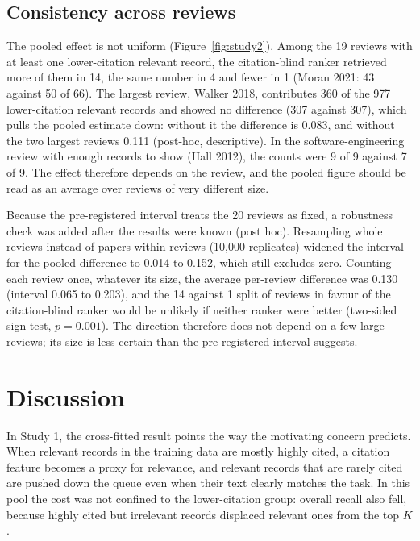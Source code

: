 \documentclass[acmsmall,screen,nonacm]{acmart}
\begin{document}
\subsection{Consistency across reviews}

The pooled effect is not uniform (Figure~\ref{fig:study2}). Among the 19 reviews with at least one
lower-citation relevant record, the citation-blind ranker retrieved more of them in 14, the same number
in 4 and fewer in 1 (Moran 2021: 43 against 50 of 66). The largest review, Walker 2018, contributes 360
of the 977 lower-citation relevant records and showed no difference (307 against 307), which pulls the
pooled estimate down: without it the difference is 0.083, and without the two largest reviews 0.111
(post-hoc, descriptive). In the software-engineering review with enough records to show
(Hall 2012), the counts were 9 of 9 against 7 of 9. The effect therefore depends on the review, and the
pooled figure should be read as an average over reviews of very different size.

Because the pre-registered interval treats the 20 reviews as fixed, a robustness check was added after the
results were known (post hoc). Resampling whole reviews instead of papers within reviews (10,000
replicates) widened the interval for the pooled difference to 0.014 to 0.152, which still excludes zero.
Counting each review once, whatever its size, the average per-review difference was 0.130 (interval 0.065
to 0.203), and the 14 against 1 split of reviews in favour of the citation-blind ranker would be unlikely
if neither ranker were better (two-sided sign test, $p = 0.001$). The direction therefore does not depend
on a few large reviews; its size is less certain than the pre-registered interval suggests.

\section{Discussion}
\label{sec:discussion}

In Study 1, the cross-fitted result points the way the motivating concern predicts. When relevant records in the
training data are mostly highly cited, a citation feature becomes a proxy for relevance, and relevant
records that are rarely cited are pushed down the queue even when their text clearly matches the task. In
this pool the cost was not confined to the lower-citation group: overall recall also fell, because highly
cited but irrelevant records displaced relevant ones from the top $K$.
\end{document}
